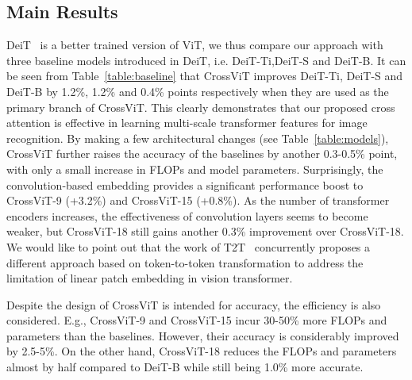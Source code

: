 \documentclass[10pt,twocolumn,letterpaper]{article}
\def\ours{CrossViT\xspace}
\newcommand{\myparagraphfirst}[1]{\vspace{0mm} \noindent {\textbf{#1}}}
\begin{document}
 \subsection{Main Results}
\myparagraphfirst{Comparisons with DeiT.}
DeiT~\cite{DeiT_touvron2020} is a better trained version of ViT, we thus compare our approach with three baseline models introduced in DeiT, i.e. DeiT-Ti,DeiT-S and DeiT-B. It can be seen from Table~\ref{table:baseline} that \ours improves DeiT-Ti, DeiT-S and DeiT-B by 1.2\%, 1.2\% and 0.4\% points respectively when they are used as the primary branch of \ours. This clearly demonstrates that our proposed cross attention is effective in learning multi-scale transformer features for image recognition.
By making a few architectural changes (see Table~\ref{table:models}), \ours further raises the accuracy of the baselines by another 0.3-0.5\% point, with only a small increase in FLOPs and model parameters. Surprisingly, the convolution-based embedding provides a significant performance boost to \ours-9 (+3.2\%) and \ours-15 (+0.8\%). As the number of transformer encoders increases, the effectiveness of convolution layers seems to become weaker, but \ours-18 still gains another 0.3\% improvement over \ours-18. We would like to point out that the work of T2T~\cite{tokenstotoken_yuan2021} concurrently proposes a different approach based on token-to-token transformation to address the limitation of linear patch embedding in vision transformer.

Despite the design of \ours is intended for accuracy, the efficiency is also considered. E.g., 
\ours-9 and \ours-15 incur 30-50\% more FLOPs and parameters than the baselines. However, their accuracy is considerably improved by 2.5-5\%. On the other hand, \ours-18 reduces the FLOPs and parameters almost by half compared to DeiT-B while still being 1.0\% more accurate. 
\end{document}
